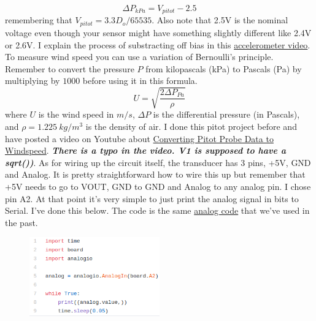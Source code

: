 \begin{equation}
\Delta P_{kPa} = V_{pitot} - 2.5
\end{equation}
remembering that $V_{pitot}=3.3D_o/65535$. Also note that 2.5V is the nominal voltage even though your sensor might have something slightly different like 2.4V or 2.6V.  I explain the process of substracting off bias in this \href{https://www.youtube.com/watch?v=e4xs9Ky7_YI&feature=youtu.be}{accelerometer video}. To measure wind speed you can use a variation of Bernoulli's principle. Remember to convert the pressure $P$ from kilopascals (kPa) to Pascals (Pa) by multiplying by $1000$ before using it in this formula.
\begin{equation*}
    U = \sqrt{\frac{2 \Delta P_{Pa}}{\rho}}
\end{equation*}
where $U$ is the wind speed in $m/s$, $\Delta P$ is the differential pressure (in Pascals), and $\rho=1.225~kg/m^3$ is the density of air. I done this pitot project before and have posted a video on Youtube about \href{https://youtu.be/jSLIRC1cfvE}{Converting Pitot Probe Data to Windspeed}. {\bf \it There is a typo in the video. V1 is supposed to have a sqrt())}.
As for wiring up the circuit itself, the transducer has 3 pins, +5V, GND and Analog. It is pretty straightforward how to wire this up but remember that +5V needs to go to VOUT, GND to GND and Analog to any analog pin. I chose pin A2. At that point it’s very simple to just print the analog signal in bits to Serial. I’ve done this below. The code is the same \href{https://github.com/cmontalvo251/Microcontrollers/blob/master/Circuit_Playground/CircuitPython/Analog/analog_simple.py}{analog code} that we’ve used in the past.
\begin{figure}[H]
  \begin{center}
    \includegraphics[width=0.5\textwidth]{Figures/analogio.png}
  \end{center}
\end{figure}
